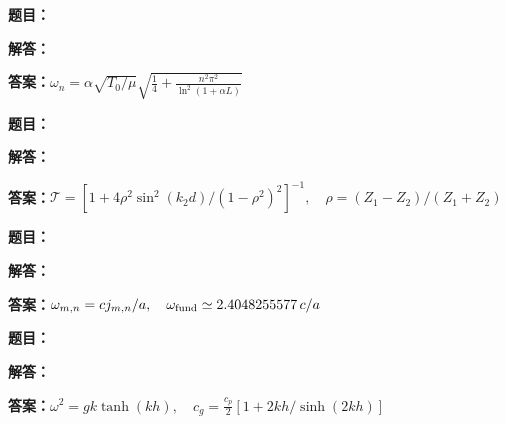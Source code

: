 \documentclass[lang=cn,color=blue,11pt]{elegantbook}
\begin{document}
\par\smallskip\noindent\hrulefill\par\medskip
{}\par
\noindent\textbf{题目：}
\par\noindent\textbf{解答：}
\par\noindent\textbf{答案：}\(\displaystyle \omega_n=\alpha\sqrt{T_0/\mu}\sqrt{\frac14+\frac{n^2\pi^2}{\ln^2(1+\alpha L)}}\)\par
\par\smallskip\noindent\hrulefill\par\medskip
{}\par
\noindent\textbf{题目：}
\par\noindent\textbf{解答：}
\par\noindent\textbf{答案：}\(\displaystyle \mathcal T=[1+4\rho^2\sin^2(k_2d)/(1-\rho^2)^2]^{-1},\quad \rho=(Z_1-Z_2)/(Z_1+Z_2)\)\par
\par\smallskip\noindent\hrulefill\par\medskip
{}\par
\noindent\textbf{题目：}
\par\noindent\textbf{解答：}
\par\noindent\textbf{答案：}\(\displaystyle \omega_{m,n}=cj_{m,n}/a,\quad\omega_{\rm fund}\simeq2.4048255577\,c/a\)\par
\par\smallskip\noindent\hrulefill\par\medskip
{}\par
\noindent\textbf{题目：}
\par\noindent\textbf{解答：}
\par\noindent\textbf{答案：}\(\displaystyle \omega^2=gk\tanh(kh),\quad c_g=\frac{c_p}{2}[1+2kh/\sinh(2kh)]\)\par
\par\smallskip\noindent\hrulefill\par\medskip
\end{document}
